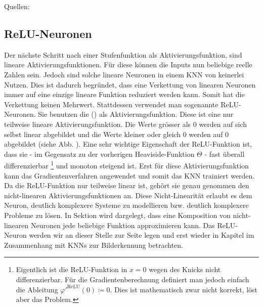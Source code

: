 \para{}
Quellen: \cite{wiki:kuenstliches_neuron} \cite{wiki:perzeptron} \cite{book:hands-on}

\subsection{ReLU-Neuronen}\label{sec:ReLU}
Der nächste Schritt nach einer Stufenfunktion als Aktivierungsfunktion, sind
lineare Aktivierungsfunktionen. Für diese können die Inputs nun beliebige reelle
Zahlen sein.
Jedoch sind solche lineare Neuronen in einem KNN von keinerlei Nutzen.
Dies ist dadurch begründet, dass eine Verkettung von linearen Neuronen
immer auf eine einzige lineare Funktion reduziert werden kann. Somit hat
die Verkettung keinen Mehrwert.
\para{}
Stattdessen verwendet man sogenannte ReLU-Neuronen. Sie benutzen die
 () als Aktivierungsfunktion.
Diese ist eine
nur teilweise lineare Aktivierungsfunktion. Die Werte grösser als 0 werden
auf sich selbst linear abgebildet und die Werte kleiner oder gleich 0 werden auf 0
abgebildet (siehe Abb. ).
Eine sehr wichtige Eigenschaft der ReLU-Funktion ist, dass sie - im Gegensatz zu der vorherigen
Heaviside-Funktion $\Theta$ - fast überall differenzierbar%
\footnote{%
  Eigentlich ist die ReLU-Funktion in $x=0$ wegen des Knicks nicht
  differenzierbar. Für die Gradientenberechnung definiert man jedoch einfach
  die Ableitung $\varphi'^{\text{ReLU}}(0) \coloneqq 0$. Dies ist mathematisch zwar nicht
  korrekt, löst aber das Problem.
}%
und monoton steigend ist. Erst für diese Aktivierungsfunktion kann das Gradientenverfahren
angewendet und somit das KNN trainiert werden.
\para{}
Da die ReLU-Funktion nur teilweise linear ist, gehört sie genau genommen den
nicht-linearen Aktivierungsfunktionen an. Diese Nicht-Linearität erlaubt es dem
Neuron, deutlich komplexere Systeme zu modellieren bzw. deutlich komplexere
Probleme zu lösen. In Sektion  wird dargelegt, dass
eine Komposition von nicht-linearen Neuronen jede beliebige Funktion approximieren kann.
\para{}
Das ReLU-Neuron werden wir an dieser Stelle zur Seite legen und erst wieder in
Kapitel  im Zusammenhang mit KNNs zur Bilderkennung betrachten.
\para{}
